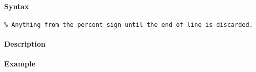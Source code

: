 


	\paragraph{Syntax}\label{syntax}

\begin{verbatim}
% Anything from the percent sign until the end of line is discarded.
\end{verbatim}

\paragraph{Description}\label{description}

\paragraph{Example}\label{example}



